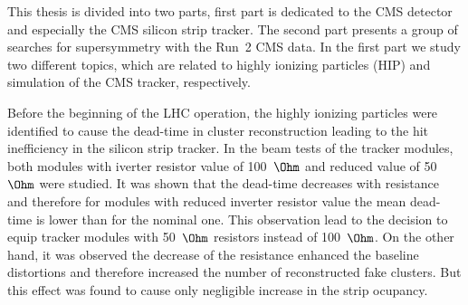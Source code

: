 


This thesis is divided into two parts, first part is dedicated to the CMS detector and especially the CMS silicon strip tracker. The second part presents a group of searches for supersymmetry with the Run~2 CMS data. In the first part we study two different topics, which are related to highly ionizing particles (HIP) and simulation of the CMS tracker, respectively. 

Before the beginning of the LHC operation, the highly ionizing particles were identified to cause the dead-time in cluster reconstruction leading to the hit inefficiency in the silicon strip tracker. In the beam tests of the tracker modules, both modules with iverter resistor value of 100~$\Ohm$ and reduced value of 50~$\Ohm$ were studied. It was shown that the dead-time decreases with resistance and therefore for modules with reduced inverter resistor value the mean dead-time is lower than for the nominal one. This observation lead to the decision to equip tracker modules with 50~$\Ohm$ resistors instead of 100~$\Ohm$. On the other hand, it was observed the decrease of the resistance enhanced the baseline distortions and therefore increased the number of reconstructed fake clusters. But this effect was found to cause only negligible increase in the strip ocupancy. 

